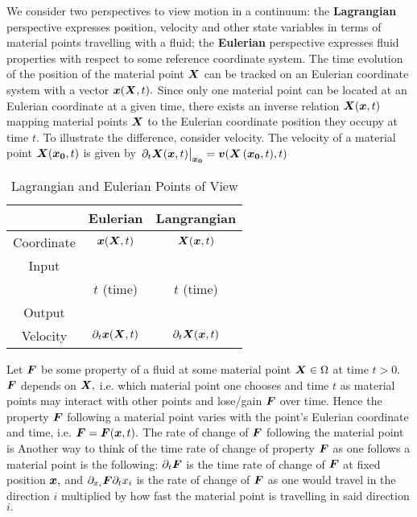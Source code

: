 We consider two perspectives to view motion in a continuum: the \textbf{Lagrangian} perspective expresses position, velocity and other state variables in terms of material points travelling with a fluid; the \textbf{Eulerian} perspective expresses fluid properties with respect to some reference coordinate system. The time evolution of the position of the material point $\boldsymbol{X}$ can be tracked on an Eulerian coordinate system with a vector $\boldsymbol{x}(\boldsymbol{X},t).$ Since only one material point can be located at an Eulerian coordinate at a given time, there exists an inverse relation $\boldsymbol{X}(\boldsymbol{x},t)$ mapping material points $\boldsymbol{X}$ to the Eulerian coordinate position they occupy at time $t.$  To illustrate the difference, consider velocity. The velocity of a material point $\boldsymbol{X}(\boldsymbol{x_0},t)$ is given by $\eval{\p_{t}\vect{X}(\vect{x},t)}_{\vect{x_0}} = \vect{v}(\vect{X}\left(\vect{x_0},t),t\right)$

\begin {table}[H]
\centering  \caption{Lagrangian and Eulerian Points of View}
\label{tbl:bdf}
\begin{tabular}{|c | c | c |}
\hline
 & Eulerian & Langrangian\\\hline
Coordinate & $\boldsymbol{x}(\boldsymbol{X},t)$ & $\boldsymbol{X}(\boldsymbol{x},t)$ \\
\hline
Input &  &    \\
      & $t$ (time) & $t$ (time)\\\hline
Output &  &    \\\hline
Velocity & $\partial_t\boldsymbol{x}(\boldsymbol{X},t)$ & $\partial_t\boldsymbol{X}(\boldsymbol{x},t)$ \\
\hline
\end{tabular}
\end{table}

Let $\boldsymbol{F}$ be some property of a fluid at some material point $\boldsymbol{X}\in\Omega$ at time $t>0$. $\boldsymbol{F}$ depends on $\boldsymbol{X},$ i.e. which material point one chooses and time $t$ as material points may interact with other points and lose/gain $\boldsymbol{F}$ over time. Hence the property $\boldsymbol{F}$ following a material point varies with the point's Eulerian coordinate and time, i.e. $\boldsymbol{F}=\boldsymbol{F}(\boldsymbol{x},t).$ The rate of change of $\boldsymbol{F}$ following the material point is
Another way to think of the time rate of change of property $\boldsymbol{F}$ as one follows a material point is the following: $\partial_{t}\boldsymbol{F}$ is the time rate of change of $\boldsymbol{F}$ at fixed position $\boldsymbol{x},$ and $\partial_{x_i}\boldsymbol{F}\partial_t x_i$ is the rate of change of $\boldsymbol{F}$ as one would travel in the direction $i$ multiplied by how fast the material point is travelling in said direction $i.$

